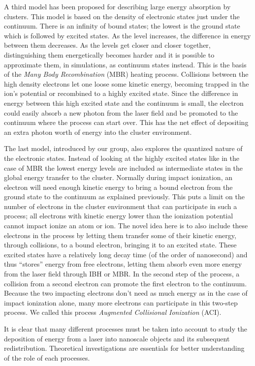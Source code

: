 A third model has been proposed for describing large energy absorption by
clusters. This model is based on the density of electronic states just under
the continuum. There is an infinity of bound states; the lowest is the ground
state which is followed by excited states. As the level increases, the
difference in energy between them decreases. As the levels get closer and
closer together, distinguishing them energetically becomes harder and it is
possible to approximate them, in simulations, as continuum states instead. This
is the basis of the \textit{Many Body Recombination} (MBR) heating
process\cite{Jungreuthmayer2005}. Collisions between the high density electrons
let one loose some kinetic energy, becoming trapped in the ion's potential or
recombined to a highly excited state. Since the difference in energy between
this high excited state and the continuum is small, the electron could easily
absorb a new photon from the laser field and be promoted to the continuum where
the process can start over. This has the net effect of depositing an extra
photon worth of energy into the cluster environment.

The last model, introduced by our group, also explores the quantized nature of
the electronic states. Instead of looking at the highly excited states like
in the case of MBR the lowest energy levels are included as intermediate states
in the global energy transfer to the cluster. Normally during impact
ionization, an electron will need enough kinetic energy to bring a bound
electron from the ground state to the continuum as explained previously. This
puts a limit on the number of electrons in the cluster environment that can
participate in such a process; all electrons with kinetic energy lower than the
ionization potential cannot impact ionize an atom or ion. The novel idea here
is to also include these electrons in the process by letting them transfer some
of their kinetic energy, through collisions, to a bound electron, bringing it
to an excited state. These excited states have a relatively long decay time (of
the order of nanosecond\citeneeded) and thus ``stores'' energy from free
electrons, letting them absorb even more energy from the laser field through
IBH or MBR. In the second step of the process, a collision from a second
electron can promote the first electron to the continuum. Because the
two impacting electrons don't need as much energy as in the case of impact
ionization alone, many more electrons can participate in this two-step
process. We called this process \textit{Augmented Collisional Ionization} (ACI).

It is clear that many different processes must be taken into account to study
the deposition of energy from a laser into nanoscale objects and its subsequent
redistribution. Theoretical investigations are essentials for better
understanding of the role of each processes.

